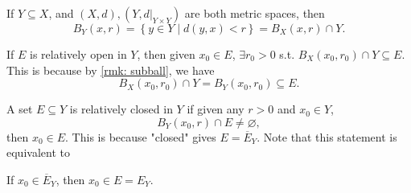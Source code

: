 \begin{remark} \label{rmk: subball} If \(Y \subseteq X\), and \((X, d), \left( Y, d\vert_{Y \times Y} \right) \) are both metric spaces, then 
   \[
            B_Y(x, r) = \left\{ y \in Y \mid d(y, x) < r \right\} = B_X(x, r) \cap Y. 
    \] 
\end{remark}

\begin{remark}
    If \(E\) is relatively open in \(Y\), then given \(x_0 \in E\), \(\exists r_0 > 0\) s.t. \(B_X(x_0, r_0) \cap Y \subseteq E\). This is because by \autoref{rmk: subball}, we have 
    \[
        B_X(x_0, r_0) \cap Y = B_Y(x_0, r_0) \subseteq E.
    \]   
\end{remark}
\begin{remark}
    A set \(E \subseteq Y\) is relatively closed in \(Y\) if given any \(r>0\) and \(x_0 \in Y\),
    \[
        B_Y(x_0, r) \cap E \neq \varnothing,
    \] then \(x_0 \in E\). This is because "closed" gives \(E = \overline{E}_Y \). Note that this statement is equivalent to 
    \begin{center}
        If \(x_0 \in \overline{E}_Y \), then \(x_0 \in E = E_Y\).  
    \end{center}
\end{remark}

